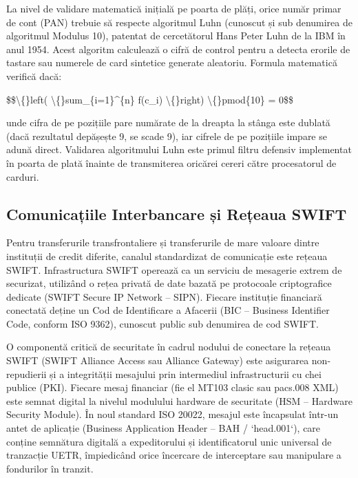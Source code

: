 La nivel de validare matematică inițială pe poarta de plăți, orice număr primar de cont (PAN) trebuie să respecte algoritmul Luhn (cunoscut și sub denumirea de algoritmul Modulus 10), patentat de cercetătorul Hans Peter Luhn de la IBM în anul 1954. Acest algoritm calculează o cifră de control pentru a detecta erorile de tastare sau numerele de card sintetice generate aleatoriu. Formula matematică verifică dacă:

\$\$\textbackslash\{\}left( \textbackslash\{\}sum\_\{i=1\}\textasciicircum{}\{n\} f(c\_i) \textbackslash\{\}right) \textbackslash\{\}pmod\{10\} = 0\$\$

unde cifra de pe pozițiile pare numărate de la dreapta la stânga este dublată (dacă rezultatul depășește 9, se scade 9), iar cifrele de pe pozițiile impare se adună direct. Validarea algoritmului Luhn este primul filtru defensiv implementat în poarta de plată înainte de transmiterea oricărei cereri către procesatorul de carduri.

\subsection{Comunicațiile Interbancare și Rețeaua SWIFT}

Pentru transferurile transfrontaliere și transferurile de mare valoare dintre instituții de credit diferite, canalul standardizat de comunicație este rețeaua SWIFT. Infrastructura SWIFT operează ca un serviciu de mesagerie extrem de securizat, utilizând o rețea privată de date bazată pe protocoale criptografice dedicate (SWIFT Secure IP Network – SIPN). Fiecare instituție financiară conectată deține un Cod de Identificare a Afacerii (BIC – Business Identifier Code, conform ISO 9362), cunoscut public sub denumirea de cod SWIFT.

O componentă critică de securitate în cadrul nodului de conectare la rețeaua SWIFT (SWIFT Alliance Access sau Alliance Gateway) este asigurarea non-repudierii și a integrității mesajului prin intermediul infrastructurii cu chei publice (PKI). Fiecare mesaj financiar (fie el MT103 clasic sau pacs.008 XML) este semnat digital la nivelul modulului hardware de securitate (HSM – Hardware Security Module). În noul standard ISO 20022, mesajul este încapsulat într-un antet de aplicație (Business Application Header – BAH / `head.001`), care conține semnătura digitală a expeditorului și identificatorul unic universal de tranzacție UETR, împiedicând orice încercare de interceptare sau manipulare a fondurilor în tranzit.


